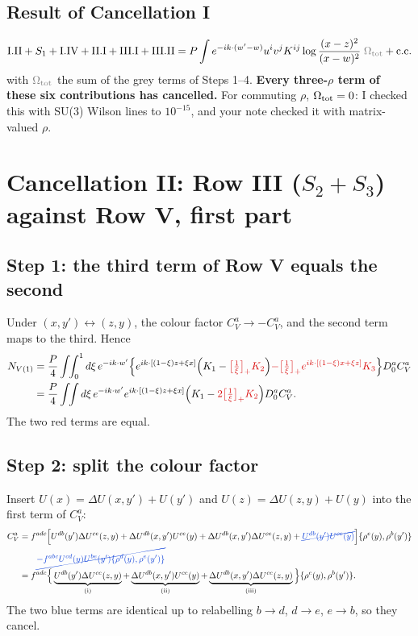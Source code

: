 \documentclass[10pt]{article}
\newcommand{\R}[1]{{\color{cR}#1}}
\newcommand{\B}[1]{{\color{cB}#1}}
\newcommand{\Gr}[1]{{\color{cX}#1}}
\begin{document}
\subsection*{Result of Cancellation I}
\begin{equation}
\text{I.II}+S_{1}+\text{I.IV}+\text{II.I}+\text{III.I}+\text{III.II}=P\int e^{-ik\cdot(w'-w)}u^{i}v^{j}K^{ij}\log\frac{(x-z)^{2}}{(x-w)^{2}}\;\Gr{\Omega_{\rm tot}}+{\rm c.c.}
\end{equation}
with $\Gr{\Omega_{\rm tot}}$ the sum of the grey terms of Steps 1--4. \textbf{Every three-$\rho$ term of these six contributions has cancelled.} For commuting $\rho$, $\Omega_{\rm tot}=0$: I checked this with SU(3) Wilson lines to $10^{-15}$, and your note checked it with matrix-valued $\rho$.

\section{Cancellation II: Row III ($S_{2}+S_{3}$) against Row V, first part}
\subsection*{Step 1: the third term of Row V equals the second}
Under $(x,y')\leftrightarrow(z,y)$, the colour factor $C_{V}^{a}\to-C_{V}^{a}$, and the second term maps to the third. Hence
\begin{align}
N_{V(1)}&=\frac P4\int\!\!\int_{0}^{1}d\xi\,e^{-ik\cdot w'}\Big\{e^{ik\cdot[(1-\xi)z+\xi x]}\Big(K_{1}-\R{\big[\tfrac1\xi\big]_{+}K_{2}}\Big)\R{-\big[\tfrac1\xi\big]_{+}e^{ik\cdot[(1-\xi)x+\xi z]}K_{3}}\Big\}D_{0}^{a}C_{V}^{a}\notag\\
&=\frac P4\int\!\!\int d\xi\,e^{-ik\cdot w'}e^{ik\cdot[(1-\xi)z+\xi x]}\Big(K_{1}-\R{2\big[\tfrac1\xi\big]_{+}K_{2}}\Big)D_{0}^{a}C_{V}^{a}.
\end{align}
The two \R{red} terms are equal.

\subsection*{Step 2: split the colour factor}
Insert $U(x)=\Delta U(x,y')+U(y')$ and $U(z)=\Delta U(z,y)+U(y)$ into the first term of $C_{V}^{a}$:
\begin{align}
C_{V}^{a}&=f^{adc}\Big[U^{db}(y')\Delta U^{ce}(z,y)+\Delta U^{db}(x,y')U^{ce}(y)+\Delta U^{db}(x,y')\Delta U^{ce}(z,y)+\B{\cancel{U^{db}(y')U^{ce}(y)}}\Big]\{\rho^{e}(y),\rho^{b}(y')\}\notag\\
&\qquad\B{\cancel{-f^{abc}U^{cd}(y)U^{be}(y')\{\rho^{d}(y),\rho^{e}(y')\}}}\notag\\
&=f^{adc}\Big\{\underbrace{U^{db}(y')\Delta U^{ce}(z,y)}_{\rm(i)}+\underbrace{\Delta U^{db}(x,y')U^{ce}(y)}_{\rm(ii)}+\underbrace{\Delta U^{db}(x,y')\Delta U^{ce}(z,y)}_{\rm(iii)}\Big\}\{\rho^{e}(y),\rho^{b}(y')\}.
\end{align}
The two \B{blue} terms are identical up to relabelling $b\to d$, $d\to e$, $e\to b$, so they cancel.
\end{document}
